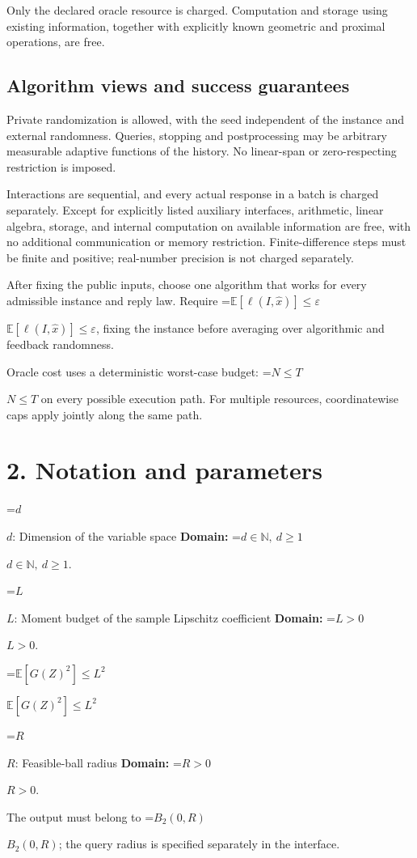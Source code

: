 \documentclass[10pt,a4paper]{article}
\newcommand{\AtlasMath}[1]{\par\begingroup\centering\setbox0=\hbox{$\displaystyle #1$}\ifdim\wd0>1.4\linewidth\typeout{ATLAS WIDE FORMULA: \the\wd0}\fi\ifdim\wd0>\linewidth\resizebox{\linewidth}{!}{\box0}\else\box0\fi\par\endgroup}
\newcommand{\AtlasInlineMath}[1]{\begingroup\setbox0=\hbox{$#1$}\ifdim\wd0>.4\linewidth\endgroup\AtlasMath{#1}\else\endgroup$#1$\fi}
\begin{document}
Only the declared oracle resource is charged. Computation and storage using existing information, together with explicitly known geometric and proximal operations, are free.

\subsection{Algorithm views and success guarantees}
Private randomization is allowed, with the seed independent of the instance and external randomness. Queries, stopping and postprocessing may be arbitrary measurable adaptive functions of the history. No linear-span or zero-respecting restriction is imposed.

Interactions are sequential, and every actual response in a batch is charged separately. Except for explicitly listed auxiliary interfaces, arithmetic, linear algebra, storage, and internal computation on available information are free, with no additional communication or memory restriction. Finite-difference steps must be finite and positive; real-number precision is not charged separately.

After fixing the public inputs, choose one algorithm that works for every admissible instance and reply law. Require \AtlasInlineMath{\mathbb{E}[\ell(I,\widehat{x})]\le \varepsilon}, fixing the instance before averaging over algorithmic and feedback randomness.

Oracle cost uses a deterministic worst-case budget: \AtlasInlineMath{N\le T} on every possible execution path. For multiple resources, coordinatewise caps apply jointly along the same path.

\section{2. Notation and parameters}
\AtlasInlineMath{d}: Dimension of the variable space \textbf{Domain:} \AtlasInlineMath{d\in\mathbb{N},\ d\ge1}.

\AtlasInlineMath{L}: Moment budget of the sample Lipschitz coefficient \textbf{Domain:} \AtlasInlineMath{L>0}.

\AtlasInlineMath{\mathbb{E}[G(Z)^2]\le L^2}

\AtlasInlineMath{R}: Feasible-ball radius \textbf{Domain:} \AtlasInlineMath{R>0}.

The output must belong to \AtlasInlineMath{B_2(0,R)}; the query radius is specified separately in the interface.
\end{document}
